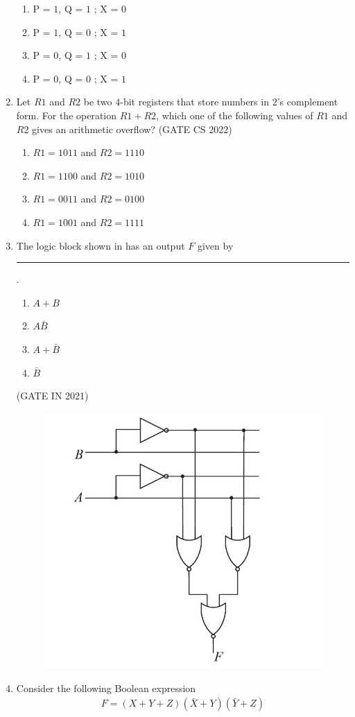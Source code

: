 \begin{enumerate}[label=\arabic*.,ref=\theenumi]
		\begin{enumerate}[label=(\Alph*)]
		\item P = $1$, Q = $1$ ; X = $0$
		\item P = $1$, Q = $0$ ; X = $1$
		\item P = $0$, Q = $1$ ; X = $0$
		\item P = $0$, Q = $0$ ; X = $1$
	\end{enumerate}
%
\item Let $R1$ and $R2$ be two $4$-bit registers that store numbers in $2$’s complement form.
For the operation $R1+R2$, which one of the following values of $R1$ and $R2$ gives an
arithmetic overflow?
\hfill{(GATE CS 2022)}
%
    \begin{enumerate}
        \item $R1 = 1011$ and $R2 = 1110$
        \item $R1 = 1100$ and $R2 = 1010$
        \item $R1 = 0011$ and $R2 = 0100$
        \item $R1 = 1001$ and $R2 = 1111$
    \end{enumerate}
\item The logic block shown 
in
	has an output $F$ given by \rule{1cm}{0.5pt}.
\begin{enumerate}
	\item$A+B$
	\item$A\bar{B}$
	\item$A+\bar{B}$
	\item$\bar{B}$
\end{enumerate}
\hfill (GATE IN 2021)
\begin{figure}[H]
\centering
\includegraphics[width=0.5\columnwidth]{figs/gatemage.jpg}
	\caption{}
\label{fig:GATE IN 2021}
\end{figure}
%
\item Consider the following Boolean expression 
\begin{align*} F = (X+Y+Z)(\bar{X}+Y)(\bar{Y}+Z) \end{align*}

\end{enumerate}
